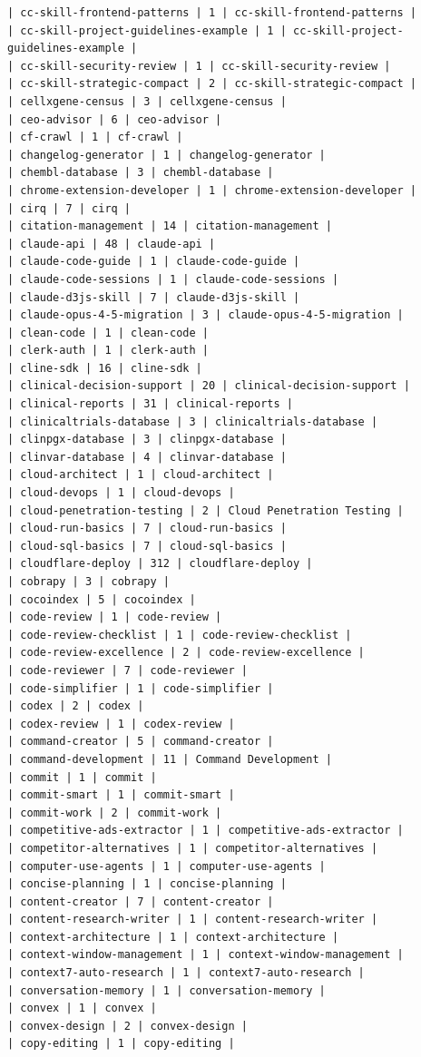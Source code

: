 \begin{Verbatim}[breaklines,breakanywhere,fontsize=\footnotesize]
| cc-skill-frontend-patterns | 1 | cc-skill-frontend-patterns |
| cc-skill-project-guidelines-example | 1 | cc-skill-project-guidelines-example |
| cc-skill-security-review | 1 | cc-skill-security-review |
| cc-skill-strategic-compact | 2 | cc-skill-strategic-compact |
| cellxgene-census | 3 | cellxgene-census |
| ceo-advisor | 6 | ceo-advisor |
| cf-crawl | 1 | cf-crawl |
| changelog-generator | 1 | changelog-generator |
| chembl-database | 3 | chembl-database |
| chrome-extension-developer | 1 | chrome-extension-developer |
| cirq | 7 | cirq |
| citation-management | 14 | citation-management |
| claude-api | 48 | claude-api |
| claude-code-guide | 1 | claude-code-guide |
| claude-code-sessions | 1 | claude-code-sessions |
| claude-d3js-skill | 7 | claude-d3js-skill |
| claude-opus-4-5-migration | 3 | claude-opus-4-5-migration |
| clean-code | 1 | clean-code |
| clerk-auth | 1 | clerk-auth |
| cline-sdk | 16 | cline-sdk |
| clinical-decision-support | 20 | clinical-decision-support |
| clinical-reports | 31 | clinical-reports |
| clinicaltrials-database | 3 | clinicaltrials-database |
| clinpgx-database | 3 | clinpgx-database |
| clinvar-database | 4 | clinvar-database |
| cloud-architect | 1 | cloud-architect |
| cloud-devops | 1 | cloud-devops |
| cloud-penetration-testing | 2 | Cloud Penetration Testing |
| cloud-run-basics | 7 | cloud-run-basics |
| cloud-sql-basics | 7 | cloud-sql-basics |
| cloudflare-deploy | 312 | cloudflare-deploy |
| cobrapy | 3 | cobrapy |
| cocoindex | 5 | cocoindex |
| code-review | 1 | code-review |
| code-review-checklist | 1 | code-review-checklist |
| code-review-excellence | 2 | code-review-excellence |
| code-reviewer | 7 | code-reviewer |
| code-simplifier | 1 | code-simplifier |
| codex | 2 | codex |
| codex-review | 1 | codex-review |
| command-creator | 5 | command-creator |
| command-development | 11 | Command Development |
| commit | 1 | commit |
| commit-smart | 1 | commit-smart |
| commit-work | 2 | commit-work |
| competitive-ads-extractor | 1 | competitive-ads-extractor |
| competitor-alternatives | 1 | competitor-alternatives |
| computer-use-agents | 1 | computer-use-agents |
| concise-planning | 1 | concise-planning |
| content-creator | 7 | content-creator |
| content-research-writer | 1 | content-research-writer |
| context-architecture | 1 | context-architecture |
| context-window-management | 1 | context-window-management |
| context7-auto-research | 1 | context7-auto-research |
| conversation-memory | 1 | conversation-memory |
| convex | 1 | convex |
| convex-design | 2 | convex-design |
| copy-editing | 1 | copy-editing |

\end{Verbatim}
